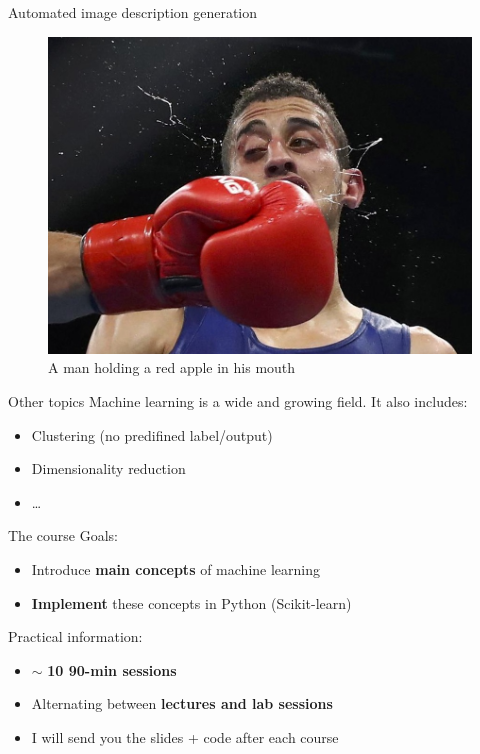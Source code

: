 \documentclass{beamer}
\begin{document}
\begin{frame}{Automated image description generation}

\begin{figure}
\vspace*{-0.15cm}
\centering
\includegraphics[width=\textwidth]{images/boxing.jpg}\\
\pause
A man holding a red apple in his mouth
\end{figure}

\end{frame}

\begin{frame}{Other topics}
\vfill
Machine learning is a wide and growing field. It also includes:	
\pause 
\vfill
\begin{itemize}
	\item Clustering (no predifined label/output)
\pause 
\vfill
	\item Dimensionality reduction
\pause 
\vfill
	\item \ldots
\end{itemize}
\vfill
\end{frame}

\begin{frame}{The course}
Goals:
\begin{itemize}
	\item Introduce \textbf{main concepts} of machine learning
	\item \textbf{Implement} these concepts in Python (Scikit-learn)
\end{itemize}
\vfill
\pause 
Practical information:
\begin{itemize}
	\item $\sim$ \textbf{10 90-min sessions}
	\item Alternating between \textbf{lectures and lab sessions}
	\item I will send you the slides + code after each course
\end{itemize}
\end{frame}
\end{document}
